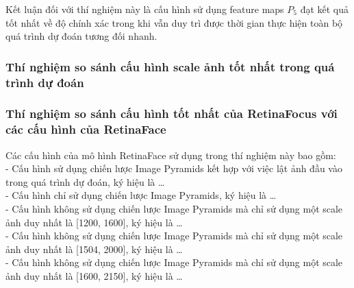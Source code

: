 {    \noindent
    Kết luận đối với thí nghiệm này là cấu hình sử dụng feature maps  ${P}_{5}$ đạt kết quả tốt nhất về độ chính xác trong khi vẫn duy trì được thời gian thực hiện toàn bộ quá trình dự đoán tương đối nhanh.

    \subsubsection*{Thí nghiệm so sánh cấu hình scale ảnh tốt nhất trong quá trình dự đoán}

    \subsubsection*{Thí nghiệm so sánh cấu hình tốt nhất của RetinaFocus với các cấu hình của RetinaFace}
    Các cấu hình của mô hình RetinaFace sử dụng trong thí nghiệm này bao gồm: \\
    - Cấu hình sử dụng chiến lược Image Pyramids kết hợp với việc lật ảnh đầu vào trong quá trình dự đoán, ký hiệu là \dots \\
    - Cấu hình chỉ sử dụng chiến lược Image Pyramids, ký hiệu là \dots \\
    - Cấu hình không sử dụng chiến lược Image Pyramids mà chỉ sử dụng một scale ảnh duy nhất là [1200, 1600], ký hiệu là \dots \\
    - Cấu hình không sử dụng chiến lược Image Pyramids mà chỉ sử dụng một scale ảnh duy nhất là [1504, 2000], ký hiệu là \dots \\
    - Cấu hình không sử dụng chiến lược Image Pyramids mà chỉ sử dụng một scale ảnh duy nhất là [1600, 2150], ký hiệu là \dots \\

}
